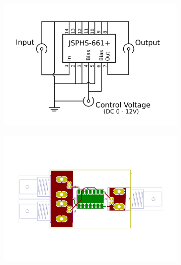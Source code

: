 \begin{figure}
	\centering
	\begin{subfigure}{.5\textwidth}
		\centering
		\includegraphics[height=0.2\textheight]{Chapters/Deflection/circuit_phase}
		\caption{}
		\label{fig:circuit_phase}
	\end{subfigure}%
	\begin{subfigure}{.5\textwidth}
		\centering
		\includegraphics[height=0.2\textheight]{Chapters/Deflection/PCB_phase}
		\caption{}
		\label{fig:PCB_phase}
	\end{subfigure}
	\caption{}
	\label{fig:PhaseShifter}
\end{figure}




